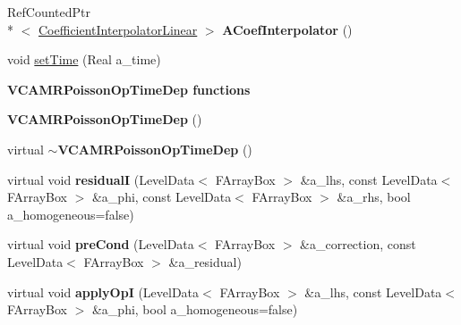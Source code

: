 \begin{DoxyCompactItemize}
\item 
\hypertarget{class_v_c_a_m_r_poisson_op_time_dep_a2e0b2cf3df319d69bdb1db5667d41ba1}{Ref\-Counted\-Ptr\\*
$<$ \hyperlink{class_coefficient_interpolator_linear}{Coefficient\-Interpolator\-Linear} $>$ {\bfseries A\-Coef\-Interpolator} ()}\label{class_v_c_a_m_r_poisson_op_time_dep_a2e0b2cf3df319d69bdb1db5667d41ba1}

\item 
void \hyperlink{class_v_c_a_m_r_poisson_op_time_dep_a92c748b0a04525a86c407a8d723d4a23}{set\-Time} (Real a\-\_\-time)
\end{DoxyCompactItemize}
\begin{Indent}{\bf V\-C\-A\-M\-R\-Poisson\-Op\-Time\-Dep functions}\par
\begin{DoxyCompactItemize}
\item 
\hypertarget{class_v_c_a_m_r_poisson_op_time_dep_a507e5003735e73077c7699c895ca77e1}{{\bfseries V\-C\-A\-M\-R\-Poisson\-Op\-Time\-Dep} ()}\label{class_v_c_a_m_r_poisson_op_time_dep_a507e5003735e73077c7699c895ca77e1}

\item 
\hypertarget{class_v_c_a_m_r_poisson_op_time_dep_a2d3835a5b2db8ee4addafb017b8a0fb0}{virtual {\bfseries $\sim$\-V\-C\-A\-M\-R\-Poisson\-Op\-Time\-Dep} ()}\label{class_v_c_a_m_r_poisson_op_time_dep_a2d3835a5b2db8ee4addafb017b8a0fb0}

\item 
\hypertarget{class_v_c_a_m_r_poisson_op_time_dep_a58e4b7a85108d65ac7ec4c68f7aa0091}{virtual void {\bfseries residual\-I} (Level\-Data$<$ F\-Array\-Box $>$ \&a\-\_\-lhs, const Level\-Data$<$ F\-Array\-Box $>$ \&a\-\_\-phi, const Level\-Data$<$ F\-Array\-Box $>$ \&a\-\_\-rhs, bool a\-\_\-homogeneous=false)}\label{class_v_c_a_m_r_poisson_op_time_dep_a58e4b7a85108d65ac7ec4c68f7aa0091}

\item 
\hypertarget{class_v_c_a_m_r_poisson_op_time_dep_acd286919fe08a8d0f65aa5352226d2ad}{virtual void {\bfseries pre\-Cond} (Level\-Data$<$ F\-Array\-Box $>$ \&a\-\_\-correction, const Level\-Data$<$ F\-Array\-Box $>$ \&a\-\_\-residual)}\label{class_v_c_a_m_r_poisson_op_time_dep_acd286919fe08a8d0f65aa5352226d2ad}

\item 
\hypertarget{class_v_c_a_m_r_poisson_op_time_dep_a918f78418e586ad193a0415f43f776fc}{virtual void {\bfseries apply\-Op\-I} (Level\-Data$<$ F\-Array\-Box $>$ \&a\-\_\-lhs, const Level\-Data$<$ F\-Array\-Box $>$ \&a\-\_\-phi, bool a\-\_\-homogeneous=false)}\label{class_v_c_a_m_r_poisson_op_time_dep_a918f78418e586ad193a0415f43f776fc}


\end{DoxyCompactItemize}
\end{Indent}
